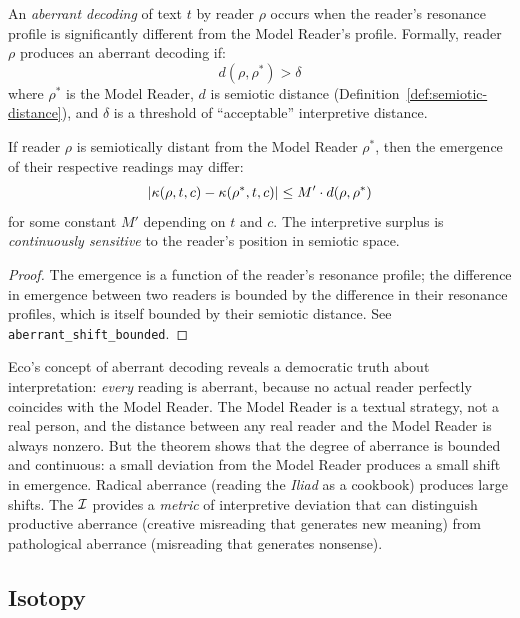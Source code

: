 \begin{definition}
\label{def:aberrant-decoding}
An \emph{aberrant decoding} of text $t$ by reader $\rho$ occurs when
the reader's resonance profile is significantly different from the
Model Reader's profile. Formally, reader $\rho$ produces an aberrant
decoding if:
\[
  d(\rho, \rho^*) > \delta
\]
where $\rho^*$ is the Model Reader, $d$ is semiotic distance
(Definition~\ref{def:semiotic-distance}), and $\delta$ is a
threshold of ``acceptable'' interpretive distance.
\end{definition}

\begin{theorem}
\label{thm:aberrant-shift}
If reader $\rho$ is semiotically distant from the Model Reader
$\rho^*$, then the emergence of their respective readings may differ:
\[
  |\kappa(\rho, t, c) - \kappa(\rho^*, t, c)| \leq
  M' \cdot d(\rho, \rho^*)
\]
for some constant $M'$ depending on $t$ and $c$. The interpretive
surplus is \emph{continuously sensitive} to the reader's position
in semiotic space.
\end{theorem}

\begin{proof}
The emergence is a function of the reader's resonance profile; the
difference in emergence between two readers is bounded by the
difference in their resonance profiles, which is itself bounded by
their semiotic distance. See \texttt{aberrant\_shift\_bounded}.
\end{proof}

\begin{interpretation}
Eco's concept of aberrant decoding reveals a democratic truth about
interpretation: \emph{every} reading is aberrant, because no actual
reader perfectly coincides with the Model Reader. The Model Reader is
a textual strategy, not a real person, and the distance between any
real reader and the Model Reader is always nonzero. But the theorem
shows that the degree of aberrance is bounded and continuous: a small
deviation from the Model Reader produces a small shift in emergence.
Radical aberrance (reading the \textit{Iliad} as a cookbook) produces
large shifts. The $\mathcal{I}$ provides a \emph{metric} of interpretive
deviation that can distinguish productive aberrance (creative
misreading that generates new meaning) from pathological aberrance
(misreading that generates nonsense).
\end{interpretation}

\subsection{Isotopy}

